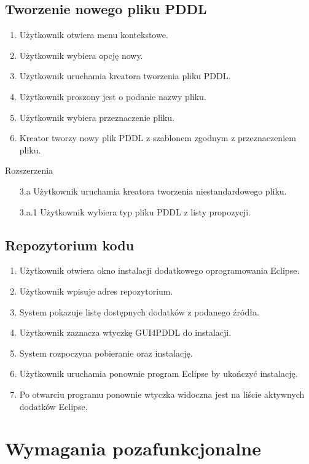 \subsection{Tworzenie nowego pliku PDDL}
\begin{enumerate}
\item Użytkownik otwiera menu kontekstowe.
\item Użytkownik wybiera opcję nowy.
\item Użytkownik uruchamia kreatora tworzenia pliku PDDL.
\item Użytkownik proszony jest o podanie nazwy pliku.
\item Użytkownik wybiera przeznaczenie pliku.
\item Kreator tworzy nowy plik PDDL z szablonem zgodnym z przeznaczeniem pliku.
\end{enumerate}
Rozszerzenia
\begin{enumerate}
\item[3.a] Użytkownik uruchamia kreatora tworzenia niestandardowego pliku.
\item[3.a.1] Użytkownik wybiera typ pliku PDDL z listy propozycji.
\end{enumerate}
\subsection{Repozytorium kodu}
\begin{enumerate}
\item Użytkownik otwiera okno instalacji dodatkowego oprogramowania Eclipse.
\item Użytkownik wpisuje adres repozytorium.
\item System pokazuje listę dostępnych dodatków z podanego źródła.
\item Użytkownik zaznacza wtyczkę GUI4PDDL do instalacji.
\item System rozpoczyna pobieranie oraz instalację.
\item Użytkownik uruchamia ponownie program Eclipse by ukończyć instalację.
\item Po otwarciu programu ponownie wtyczka widoczna jest na liście aktywnych dodatków Eclipse.
\end{enumerate}
\section{Wymagania pozafunkcjonalne}
